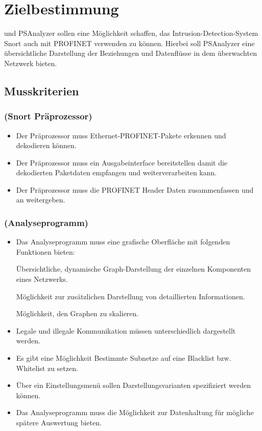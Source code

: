 \chapter{Zielbestimmung}

\programname und PSAnalyzer sollen eine Möglichkeit schaffen, das Intrusion-Detection-System Snort auch mit PROFINET verwenden zu können.
Hierbei soll PSAnalyzer eine übersichtliche Darstellung der Beziehungen und Datenflüsse in dem überwachten Netzwerk bieten.

\section{Musskriterien}

\subsection{\sppname (Snort Präprozessor)}

\begin{itemize}
\item Der Präprozessor muss Ethernet-PROFINET-Pakete erkennen und dekodieren können.

\item Der Präprozessor muss ein Ausgabeinterface bereitstellen damit \programname die dekodierten Paketdaten empfangen und weiterverarbeiten kann.

\item Der Präprozessor muss die PROFINET Header Daten zusammenfassen und an \programname weitergeben.
\end{itemize}

\subsection{\programname (Analyseprogramm)}

\begin{itemize}
\item Das Analyseprogramm muss eine grafische Oberfläche mit folgenden Funktionen bieten:

    \subitem Übersichtliche, dynamische Graph-Darstellung der einzelnen Komponenten eines Netzwerks.

    \subitem Möglichkeit zur zusätzlichen Darstellung von detaillierten Informationen.
    
    \subitem Möglichkeit, den Graphen zu skalieren.

\item Legale und illegale Kommunikation müssen unterschiedlich dargestellt werden.

\item Es gibt eine Möglichkeit Bestimmte Subnetze auf eine Blacklist bzw. Whitelist zu setzen.

\item Über ein Einstellungsmenü sollen Darstellungsvarianten spezifiziert werden können.

\item Das Analyseprogramm muss die Möglichkeit zur Datenhaltung für mögliche spätere Auswertung bieten.
\end{itemize}


